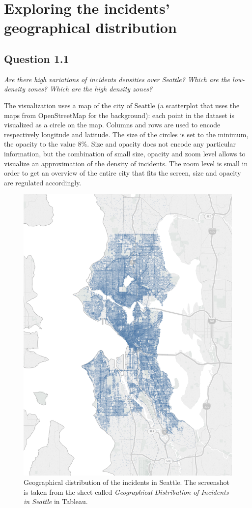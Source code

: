\section{Exploring the incidents' geographical distribution}
\label{sec:question1}

\subsection*{Question 1.1}
\textit{Are there high variations of incidents densities over Seattle? Which are the low-density zones? Which are the high density zones?}

The visualization uses a map of the city of Seattle (a scatterplot that uses the maps from OpenStreetMap for the background):
each point in the dataset is visualized as a circle on the map.
Columns and rows are used to encode respectively longitude and latitude.
The size of the circles is set to the minimum, the opacity to the value $8\%$.
Size and opacity does not encode any particular information, but the combination of small size, opacity and zoom level allows to visualize an approximation of the density of incidents.
The zoom level is small in order to get an overview of the entire city that fits the screen, size and opacity are regulated accordingly.

\begin{figure}[h]
	\centering
	\includegraphics[width=.75\columnwidth]{figures/1_1_geographical_distribution_incidents}
	\caption{Geographical distribution of the incidents in Seattle. The screenshot is taken from the sheet called \textit{Geographical Distribution of Incidents in Seattle} in Tableau.}
	\label{fig:1_1_geographical_distribution_incidents}
\end{figure}

